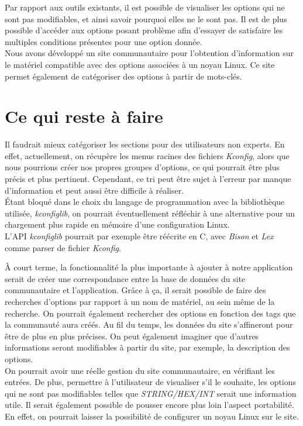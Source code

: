 \documentclass[17pts]{report}
\begin{document}
Par rapport aux outils existants, il est possible de visualiser les options qui
ne sont pas modifiables, et ainsi savoir pourquoi elles ne le sont pas.  Il est
de plus possible d'accéder aux options posant problème afin d'essayer de
satisfaire les multiples conditions présentes pour une option donnée.\\

Nous avons développé un site communautaire pour l'obtention d'information sur
le matériel compatible avec des options associées à un noyau Linux. Ce site
permet également de catégoriser des options à partir de mots-clés.

\section{Ce qui reste à faire}
\label{sec:Ce qui reste à faire}
Il faudrait mieux catégoriser les sections pour des utilisateurs non experts.
En effet, actuellement, on récupère les menus racines des fichiers
\textit{Kconfig}, alors que nous pourrions créer nos propres groupes d'options,
ce qui pourrait être plus précis et plus pertinent. Cependant, ce tri peut être
sujet à l'erreur par manque d'information et peut aussi être difficile à
réaliser.\\

Étant bloqué dans le choix du langage de programmation avec la bibliothèque
utilisée, \textit{kconfiglib}, on pourrait éventuellement réfléchir à une
alternative pour un chargement plus rapide en mémoire d'une configuration
Linux.\\

L'API \textit{kconfiglib} pourrait par exemple être réécrite en C, avec
\textit{Bison} et \textit{Lex} comme parser de fichier \textit{Kconfig}.

À court terme, la fonctionnalité la plus importante à ajouter à notre
application serait de créer une correspondance entre la base de données du site
communautaire et l'application. Grâce à ça, il serait possible de faire des
recherches d'options par rapport à un nom de matériel, au sein même de la
recherche. On pourrait également rechercher des options en fonction des tags
que la communauté aura créés. Au fil du temps, les données du site s'affineront
pour être de plus en plus précises. On peut également imaginer que d'autres
informations seront modifiables à partir du site, par exemple, la
description des options.\\

On pourrait avoir une réelle gestion du site communautaire, en vérifiant les
entrées. De plus, permettre à l'utilisateur de visualiser s'il le souhaite, les
options qui ne sont pas modifiables telles que \textit{STRING/HEX/INT} serait
une information utile. Il serait également possible de pousser encore plus
loin l'aspect portabilité. En effet, on pourrait laisser la possibilité de
configurer un noyau Linux sur le site.\\
\end{document}
